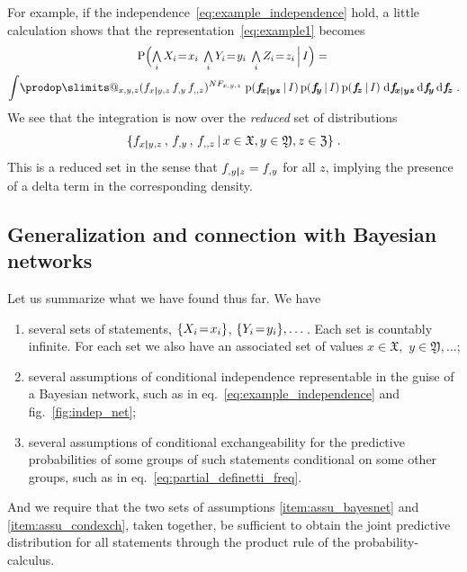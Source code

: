 \documentclass[\ifafour a4paper,12pt,\else a5paper,10pt,\fi%
onecolumn,oneside,article,%
british%
]{memoir}
\makeatletter
\theoremstyle{remark}
\theoremstyle{innote}
\def\prod{\DOTSI\prodop\slimits@}
\newcommand*{\di}{\mathrm{d}}%
\newcommand*{\Land}{\mathop{\textstyle\bigwedge}}
\DeclarePairedDelimiter\set{\{}{\}}
\newcommand*{\pf}{\mathrm{p}}%
\newcommand*{\p}{\mathrm{P}}%
\renewcommand*{\|}[1][]{\nonscript\,#1\vert\nonscript\,\mathopen{}}
\newcommand*{\eqn}{eq.}%
\newcommand*{\fig}{fig.}%
\renewcommand*{\=}{\TextOrMath\texteq\eq}
\newcommand*{\X}[1]{X_{#1}}
\newcommand*{\x}[1]{x_{#1}}
\newcommand*{\A}[1]{A_{#1}}
\newcommand*{\B}[1]{B_{#1}}
\newcommand*{\Y}[1]{Y_{#1}}
\newcommand*{\y}[1]{y_{#1}}
\newcommand*{\Z}[1]{Z_{#1}}
\newcommand*{\z}[1]{z_{#1}}
\newcommand*{\sx}{\mathfrak{X}}
\newcommand*{\sy}{\mathfrak{Y}}
\newcommand*{\sz}{\mathfrak{Z}}
\newcommand*{\ff}[1]{f_{#1}}
\newcommand*{\ffb}[1]{\bm{f_{\!#1}}}
\newcommand*{\FF}[1]{F_{#1}}
\newcommand*{\bcond}[1][]{\nonscript\,#1\bm{\vert}\nonscript\;\mathopen{}}
\makeatother
\begin{document}
For example, if the independence~\eqref{eq:example_independence} hold, a
little calculation shows that the representation~\eqref{eq:example1} becomes
\begin{multline}
  \label{eq:example1sep}
\p\Bigl( \Land_{i}\X{i}\=\x{i} \;  \Land_{i}\Y{i}\=\y{i} \;
\Land_{i}\Z{i}\=\z{i} \|[\Big] I\Bigr)
   ={}\\
     \int\!\prod_{x,y,z}
     (\ff{x \bcond y,z}\, \ff{,y}\, \ff{,,z})^{N \FF{x,y,z}}\;%
\pf(\ffb{x \bcond y z}\|I)\,\pf(\ffb{y}\|I)\,\pf(\ffb{z}\|I)
\;\di\ffb{x \bcond y z} \,\di\ffb{y} \,\di\ffb{z} \;.
\end{multline}
We see that the integration is now over the \emph{reduced} set of
distributions
\begin{equation}
  \label{eq:subset_freqs}
  \set{\ff{x \bcond y,z} \,,\, \ff{,y} \,,\, \ff{,,z} \|
    x \in \sx, y \in \sy, z \in \sz} \;.
\end{equation}
This is a reduced set in the sense that $\ff{,y \bcond z} = \ff{,y}$ for
all $z$, implying the presence of a delta term in the corresponding
density.


\subsection{Generalization and connection with Bayesian networks}
\label{sec:graph_repr_gen}

Let us summarize what we have found thus far. We have
\begin{enumerate}[label=\roman*.]
\item[0.] several sets of statements, $\set{\X{i}\=\x{i}}$,
  $\set{\Y{i}\=\y{i}},\dotsc$. Each set is countably infinite. For each
  set we also have an associated set of values $x\in \sx,$
  $y \in \sy, \dotsc$;
\item\label{item:assu_bayesnet} several assumptions of conditional independence representable in the
  guise of a Bayesian network, such as in
  \eqn~\eqref{eq:example_independence} and \fig~\ref{fig:indep_net};
\item\label{item:assu_condexch} several assumptions of conditional exchangeability for the predictive
  probabilities of some groups of such statements conditional on some other
  groups, such as in \eqn~\eqref{eq:partial_definetti_freq}.
\end{enumerate}
And we require that the two sets of assumptions \ref{item:assu_bayesnet}
and \ref{item:assu_condexch}, taken together, be sufficient to obtain the
joint predictive distribution for all statements through the product rule
of the probability-calculus.
\end{document}
